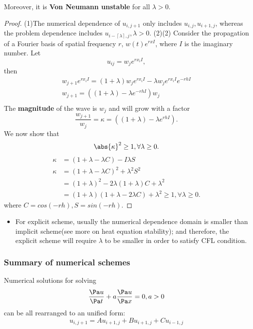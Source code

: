 \begin{refsection}
\begin{lemma}
	Moreover, it is \textbf{Von Neumann unstable} for all $\lambda > 0$.
\end{lemma}
\begin{proof}
(1)The numerical dependence of $u_{i,j+1}$ only includes $u_{i,j}, u_{i+1,j}$, whereas the problem dependence includes $u_{i-\left \lceil{\lambda}\right \rceil,j},\lambda > 0$.
(2)(2) Consider the propagation of a Fourier basis of spatial frequency $r$, $w(t)e^{rxI}$, where $I$ is the imaginary number. Let $$u_{ij} = w_j e^{rx_i I},$$ then
\begin{align*}
w_{j+1}e^{rx_i I} = (1+\lambda)w_j e^{rx_i I} - \lambda w_j e^{rx_i I}e^{-rhI} \\
w_{j+1} = ((1+\lambda) - \lambda e^{-rhI} )w_j  \\
\end{align*}
The \textbf{magnitude} of the wave is $w_j$ and will grow with a factor
$$\frac{w_{j+1}}{w_j} = \kappa = ((1+\lambda) - \lambda e^{rhI}).$$ We now show that $$\abs{\kappa}^2\geq 1,\forall \lambda \geq 0.$$
\begin{align*}
\kappa &=  (1+\lambda - \lambda C) - I\lambda S\\
\kappa &= (1+\lambda - \lambda C)^2 + \lambda ^2 S^2 \\
&= (1 + \lambda)^2 - 2 \lambda(1+\lambda) C + \lambda^2\\
&=(1+\lambda)(1+\lambda - 2\lambda C) + \lambda^2 \geq 1,\forall \lambda \geq 0.
\end{align*}
where $C=cos(-rh),S=sin(-rh)$.
\end{proof}


\begin{remark}\hfill
	\begin{itemize}
		\item For explicit scheme, usually the numerical dependence domain is smaller than implicit scheme(see more on heat equation stability); and therefore, the explicit scheme will require $\lambda$ to be smaller in order to satisfy CFL condition.
	\end{itemize}
\end{remark}


\subsubsection{Summary of numerical schemes}

Numerical solutions for solving $$\frac{\Pa u}{\Pa t} + a \frac{\Pa u}{\Pa x} = 0,a > 0 $$ can be all rearranged to an unified form:
$$u_{i,j+1} = Au_{i+1,j} + Bu_{i+1,j} + Cu_{i-1,j}$$


\end{refsection}
